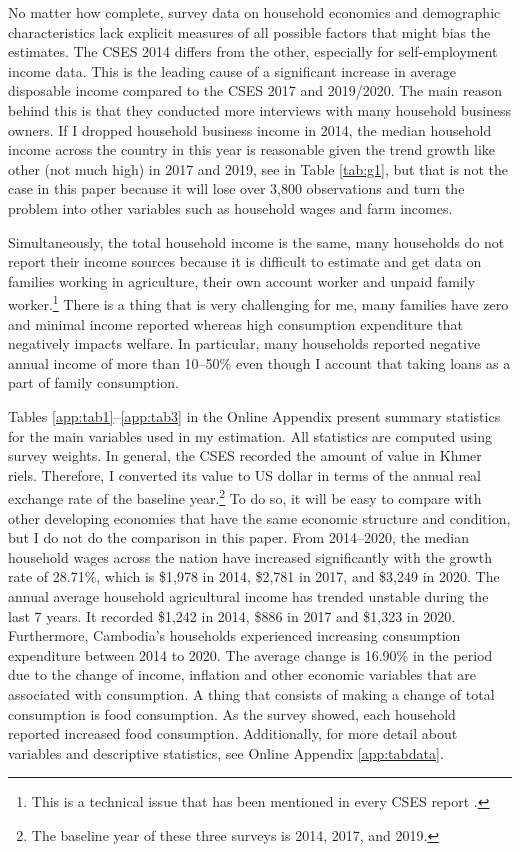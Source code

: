 \documentclass[11pt,letterpaper]{article}
\begin{document}
No matter how complete, survey data on household economics and demographic characteristics lack explicit measures of all possible factors that might bias the estimates. The CSES 2014 differs from the other, especially for self-employment income data. This is the leading cause of a significant increase in average disposable income compared to the CSES 2017 and 2019/2020. The main reason behind this is that they conducted more interviews with many household business owners. If I dropped household business income in 2014, the median household income across the country in this year is reasonable given the trend growth like other (not much high) in 2017 and 2019, see in Table \ref{tab:g1}, but that is not the case in this paper because it will lose over 3,800 observations and turn the problem into other variables such as household wages and farm incomes. 

Simultaneously, the total household income is the same, many households do not report their income sources because it is difficult to estimate and get data on families working in agriculture, their own account worker and unpaid family worker.\footnote{This is a technical issue that has been mentioned in every CSES report \cite{NIS2019}.} There is a thing that is very challenging for me, many families have zero and minimal income reported whereas high consumption expenditure that negatively impacts welfare. In particular, many households reported negative annual income of more than 10--50\% even though I account that taking loans as a part of family consumption. 

Tables \ref{app:tab1}--\ref{app:tab3} in the Online Appendix present summary statistics for the main variables used in my estimation. All statistics are computed using survey weights. In general, the CSES recorded the amount of value in Khmer riels. Therefore, I converted its value to US dollar in terms of the annual real exchange rate of the baseline year.\footnote{The baseline year of these three surveys is 2014, 2017, and 2019.} To do so, it will be easy to compare with other developing economies that have the same economic structure and condition, but I do not do the comparison in this paper. From 2014--2020, the median household wages across the nation have increased significantly with the growth rate of 28.71\%, which is \$1,978 in 2014, \$2,781 in 2017, and \$3,249 in 2020. The annual average household agricultural income has trended unstable during the last 7 years. It recorded \$1,242 in 2014, \$886 in 2017 and \$1,323 in 2020. Furthermore, Cambodia’s households experienced increasing consumption expenditure between 2014 to 2020. The average change is 16.90\% in the period due to the change of income, inflation and other economic variables that are associated with consumption. A thing that consists of making a change of total consumption is food consumption. As the survey showed, each household reported increased food consumption. Additionally, for more detail about variables and descriptive statistics, see Online Appendix \ref{app:tabdata}.
\end{document}

